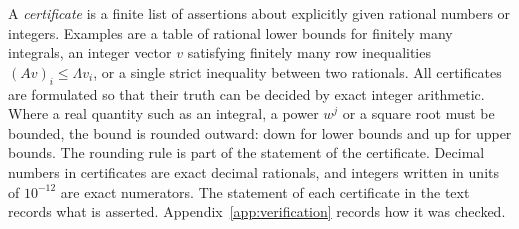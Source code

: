 A \emph{certificate} is a finite list of assertions about explicitly given rational numbers or integers. Examples are a table of rational lower bounds for finitely many integrals, an integer vector $v$ satisfying finitely many row inequalities $(Av)_i\le\Lambda v_i$, or a single strict inequality between two rationals. All certificates are formulated so that their truth can be decided by exact integer arithmetic. Where a real quantity such as an integral, a power $w^j$ or a square root must be bounded, the bound is rounded outward: down for lower bounds and up for upper bounds. The rounding rule is part of the statement of the certificate. Decimal numbers in certificates are exact decimal rationals, and integers written in units of $10^{-12}$ are exact numerators. The statement of each certificate in the text records what is asserted. Appendix~\ref{app:verification} records how it was checked.
